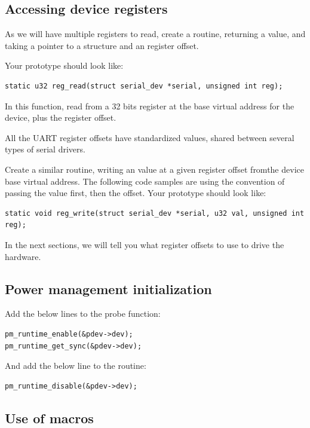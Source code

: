 \subsection{Accessing device registers}

As we will have multiple registers to read, create a 
routine, returning a  value, and taking a 
pointer to a  structure and an 
register offset.

Your prototype should look like:
\begin{verbatim}
static u32 reg_read(struct serial_dev *serial, unsigned int reg);
\end{verbatim}

In this function, read from a 32 bits register at the base virtual
address for the device, plus the register offset.

All the UART register offsets have standardized values, shared between
several types of serial drivers.

Create a similar  routine, writing an 
value at a given register offset fromthe device base virtual address.
The following code samples are using
the  convention of passing the value first, then the
offset. Your prototype should look like:
\begin{verbatim}
static void reg_write(struct serial_dev *serial, u32 val, unsigned int reg);
\end{verbatim}

In the next sections, we will tell you what register offsets to use
to drive the hardware.

\subsection{Power management initialization}

Add the below lines to the probe function:

\begin{verbatim}
pm_runtime_enable(&pdev->dev);
pm_runtime_get_sync(&pdev->dev);
\end{verbatim}

And add the below line to the  routine:

\begin{verbatim}
pm_runtime_disable(&pdev->dev);
\end{verbatim}
\subsection{Use of macros}

